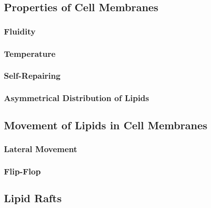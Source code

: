 \documentclass[../main.tex]{subfiles}
\begin{document}
    

    \subsection{Properties of Cell Membranes}
        \subsubsection{Fluidity}


        \subsubsection{Temperature}


        \subsubsection{Self-Repairing}

        \subsubsection{Asymmetrical Distribution of Lipids}

    \subsection{Movement of Lipids in Cell Membranes}
        
        \subsubsection{Lateral Movement}

        \subsubsection{Flip-Flop}


    \subsection{Lipid Rafts}


\printglossaries
\end{document}
